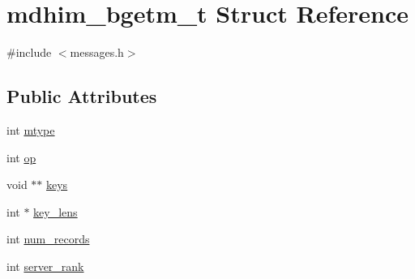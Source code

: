 \hypertarget{structmdhim__bgetm__t}{\section{mdhim\-\_\-bgetm\-\_\-t Struct Reference}
\label{d5/def/structmdhim__bgetm__t}
}


{\ttfamily \#include $<$messages.\-h$>$}

\subsection*{Public Attributes}
\begin{DoxyCompactItemize}
\item 
int \hyperlink{structmdhim__bgetm__t_aa52b25716fcf7fdc26af4dd48056d976}{mtype}
\item 
int \hyperlink{structmdhim__bgetm__t_aa4e54e836da625bad6ebc439c5f9e047}{op}
\item 
void $\ast$$\ast$ \hyperlink{structmdhim__bgetm__t_a6abc6929954a3e7aab4b71f12b9db668}{keys}
\item 
int $\ast$ \hyperlink{structmdhim__bgetm__t_a1bda084b30e5429093159a78827efb52}{key\-\_\-lens}
\item 
int \hyperlink{structmdhim__bgetm__t_af952f7de3351ee73515c1948c5faf927}{num\-\_\-records}
\item 
int \hyperlink{structmdhim__bgetm__t_a33b8bbb7a13cf0773954c22b18cac4f4}{server\-\_\-rank}
\end{DoxyCompactItemize}


